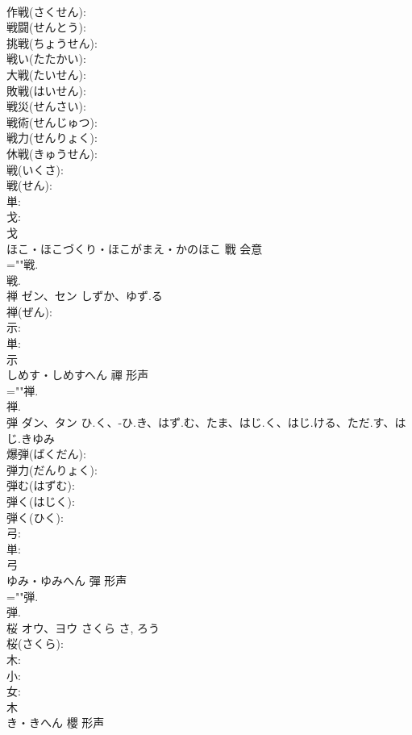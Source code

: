 \documentclass[8pt]{extreport}
\begin{document}
\begin{CJK}{UTF8}{min}
\\	作戦(さくせん): 
\\	戦闘(せんとう): 
\\	挑戦(ちょうせん): 
\\	戦い(たたかい): 
\\	大戦(たいせん): 
\\	敗戦(はいせん): 
\\	戦災(せんさい): 
\\	戦術(せんじゅつ): 
\\	戦力(せんりょく): 
\\	休戦(きゅうせん): 
\\	戦(いくさ): 
\\	戦(せん): 
\\	単: 
\\	戈: 
\\	戈	
\\	ほこ・ほこづくり・ほこがまえ・かのほこ	戰	会意 
\\	=""戦.
\\	戦.
\\	禅	ゼン、セン	しずか、ゆず.る		
\\	禅(ぜん): 
\\	示: 
\\	単: 
\\	示	
\\	しめす・しめすへん	禪	形声 
\\	=""禅.
\\	禅.
\\	弾	ダン、タン	ひ.く、-ひ.き、はず.む、たま、はじ.く、はじ.ける、ただ.す、はじ.きゆみ		
\\	爆弾(ばくだん): 
\\	弾力(だんりょく): 
\\	弾む(はずむ): 
\\	弾く(はじく): 
\\	弾く(ひく): 
\\	弓: 
\\	単: 
\\	弓	
\\	ゆみ・ゆみへん	彈	形声 
\\	=""弾.
\\	弾.
\\	桜	オウ、ヨウ	さくら	さ, ろう	
\\	桜(さくら): 
\\	木: 
\\	小: 
\\	女: 
\\	木	
\\	き・きへん	櫻	形声 

\end{CJK}
\end{document}
